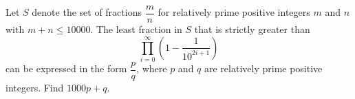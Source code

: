 Let $S$ denote the set of fractions $\dfrac mn$ for relatively prime positive integers $m$ and $n$ with $m+n\le 10000$. The least fraction in $S$ that is strictly greater than \[\prod_{i=0}^\infty \left(1-\dfrac{1}{10^{2i+1}}\right)\] can be expressed in the form $\dfrac pq$, where $p$ and $q$ are relatively prime positive integers. Find $1000p+q$.
